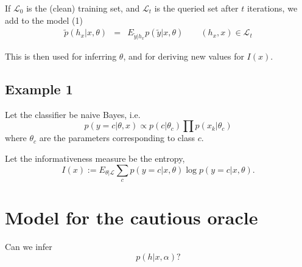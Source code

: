 \documentclass[10pt, onecolumn]{article}
\renewcommand{\L}{\mathcal{L}}
\begin{document}
If $\L_0$ is the (clean) training set, and $\L_t$ is the queried set after $t$ iterations, we add to the model (1)
\begin{eqnarray}
\tilde p(h_x|x, \theta) &=& E_{\tilde y|h_x}p(\tilde y|x, \theta) \qquad (h_x, x)\in \L_t
\end{eqnarray}

This is then used for inferring $\theta$, and for deriving new  values for $I(x)$.

\subsection{Example 1}
Let the classifier be naive Bayes, i.e. $$p(y=c|\theta, x) \propto p(c|\theta_c)\prod p(x_k |\theta_c)$$ where $\theta_c$ are the parameters corresponding to class $c$. 

Let the informativeness measure be the entropy,
$$I(x):=E_{\theta|\L}\sum_c p(y=c|x, \theta)\log p(y=c|x, \theta).$$



\section{Model for the cautious oracle}
Can we infer $$p(h|x, \alpha)?$$ 
\end{document}
